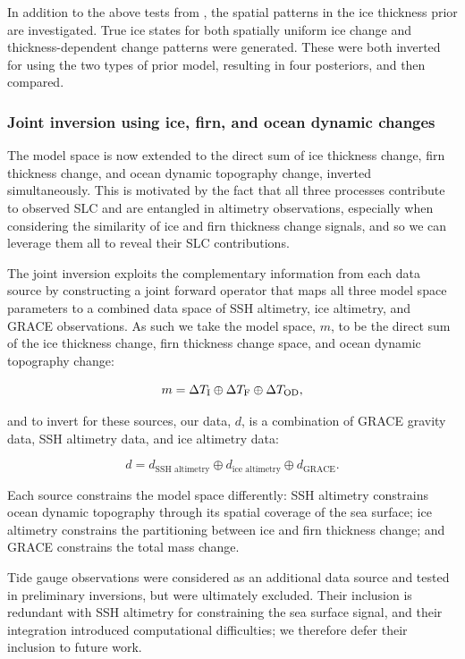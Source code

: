 In addition to the above tests from \textcite{heathcoteScaleableBayesianFramework2026}, the spatial patterns in the ice thickness prior are investigated. True ice states for both spatially uniform ice change and thickness-dependent change patterns were generated. These were both inverted for using the two types of prior model, resulting in four posteriors, and then compared.

\subsubsection{Joint inversion using ice, firn, and ocean dynamic changes}

The model space is now extended to the direct sum of ice thickness change, firn thickness change, and ocean dynamic topography change, inverted simultaneously. This is motivated by the fact that all three processes contribute to observed SLC and are entangled in altimetry observations, especially when considering the similarity of ice and firn thickness change signals, and so we can leverage them all to reveal their SLC contributions.

The joint inversion exploits the complementary information from each data source by constructing a joint forward operator that maps all three model space parameters to a combined data space of SSH altimetry, ice altimetry, and GRACE observations. As such we take the model space, $m$, to be the direct sum of the ice thickness change, firn thickness change space, and ocean dynamic topography change:

\begin{equation}
	m = \Delta T_\text{I} \oplus \Delta T_\text{F} \oplus \Delta T_\text{OD},
\end{equation}

and to invert for these sources, our data, $d$, is a combination of GRACE gravity data, SSH altimetry data, and ice altimetry data:


\begin{equation}
d = d_{\text{SSH altimetry}} \oplus d_{\text{ice altimetry}} \oplus d_{\text{GRACE}}.
\end{equation}

Each source constrains the model space differently: SSH altimetry constrains ocean dynamic topography through its spatial coverage of the sea surface; ice altimetry constrains the partitioning between ice and firn thickness change; and GRACE constrains the total mass change.

Tide gauge observations were considered as an additional data source and tested in preliminary inversions, but were ultimately excluded. Their inclusion is redundant with SSH altimetry for constraining the sea surface signal, and their integration introduced computational difficulties; we therefore defer their inclusion to future work.

